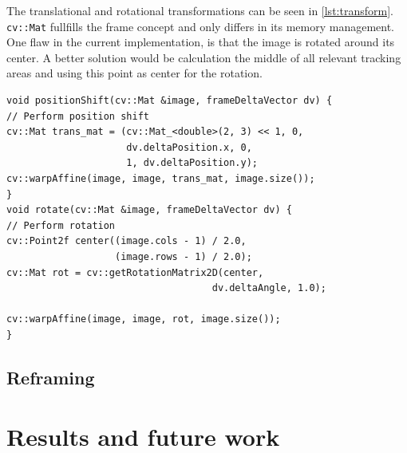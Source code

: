 The translational and rotational transformations can be seen in \cref{lst:transform}. \texttt{cv::Mat} fullfills the frame concept and only differs in its memory management. One flaw in the current implementation, is that the image is rotated around its center. A better solution would be calculation the middle of all relevant tracking areas and using this point as center for the rotation.

\begin{lstlisting}[caption={Frame transformations},label=lst:transform]
void positionShift(cv::Mat &image, frameDeltaVector dv) {
// Perform position shift
cv::Mat trans_mat = (cv::Mat_<double>(2, 3) << 1, 0,
                     dv.deltaPosition.x, 0,
                     1, dv.deltaPosition.y);
cv::warpAffine(image, image, trans_mat, image.size());
}
void rotate(cv::Mat &image, frameDeltaVector dv) {
// Perform rotation
cv::Point2f center((image.cols - 1) / 2.0,
                   (image.rows - 1) / 2.0);
cv::Mat rot = cv::getRotationMatrix2D(center,
                                    dv.deltaAngle, 1.0);

cv::warpAffine(image, image, rot, image.size());
}
\end{lstlisting}

\subsection{Reframing}

\section{Results and future work}




%
%         
%         
% 


\printbibliography\cleardoublepage


